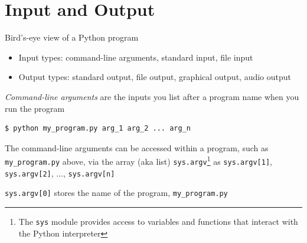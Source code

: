 \documentclass[8pt,a4paper,compress]{beamer}
\begin{document}
\section{Input and Output}
\begin{frame}[fragile]
Bird's-eye view of a Python program
\begin{center}
\end{center}
\begin{itemize}
\item Input types: command-line arguments, standard input, file input
\item Output types: standard output, file output, graphical output, audio output
\end{itemize}
\end{frame}

\begin{frame}[fragile]
\emph{Command-line arguments} are the inputs you list after a program name when you run the program

\begin{lstlisting}[language={}]
$ python my_program.py arg_1 arg_2 ... arg_n
\end{lstlisting}

\bigskip

The command-line arguments can be accessed within a program, such as \lstinline{my_program.py} above, via the array (aka list) \lstinline{sys.argv}\footnote{The \lstinline{sys} module provides access to variables and functions that interact with the Python interpreter}  as \lstinline{sys.argv[1]}, \lstinline{sys.argv[2]}, $\dots$, \lstinline{sys.argv[n]}

\bigskip

\lstinline{sys.argv[0]} stores the name of the program, \lstinline{my_program.py}
\end{frame}
\end{document}
